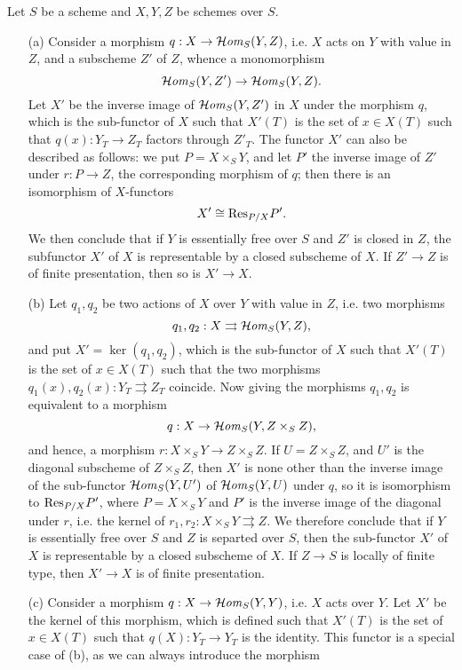 \begin{example}\label{scheme subfunctor Weil restriction example}
Let $S$ be a scheme and $X,Y,Z$ be schemes over $S$.
\begin{enumerate}
    \item[(a)] Consider a morphism $q:X\to\operatorname{\mathcal{H}\hspace*{-0.4pt}\textit{om}\hspace{0.5pt}}_S(Y,Z)$, i.e. $X$ acts on $Y$ with value in $Z$, and a subscheme $Z'$ of $Z$, whence a monomorphism
    \[\operatorname{\mathcal{H}\hspace*{-0.4pt}\textit{om}\hspace{0.5pt}}_S(Y,Z')\to\operatorname{\mathcal{H}\hspace*{-0.4pt}\textit{om}\hspace{0.5pt}}_S(Y,Z).\]
    Let $X'$ be the inverse image of $\operatorname{\mathcal{H}\hspace*{-0.4pt}\textit{om}\hspace{0.5pt}}_S(Y,Z')$ in $X$ under the morphism $q$, which is the sub-functor of $X$ such that $X'(T)$ is the set of $x\in X(T)$ such that $q(x):Y_T\to Z_T$ factors through $Z'_T$. The functor $X'$ can also be described as follows: we put $P=X\times_SY$, and let $P'$ the inverse image of $Z'$ under $r:P\to Z$, the corresponding morphism of $q$; then there is an isomorphism of $X$-functors
    \[X'\cong\mathrm{Res}_{P/X}P'.\]
    We then conclude that if $Y$ is essentially free over $S$ and $Z'$ is closed in $Z$, the subfunctor $X'$ of $X$ is representable by a closed subscheme of $X$. If $Z'\to Z$ is of finite presentation, then so is $X'\to X$.
    \item[(b)] Let $q_1,q_2$ be two actions of $X$ over $Y$ with value in $Z$, i.e. two morphisms
    \[q_1,q_2:X\rightrightarrows\operatorname{\mathcal{H}\hspace*{-0.4pt}\textit{om}\hspace{0.5pt}}_S(Y,Z),\]
    and put $X'=\ker(q_1,q_2)$, which is the sub-functor of $X$ such that $X'(T)$ is the set of $x\in X(T)$ such that the two morphisms $q_1(x),q_2(x):Y_T\rightrightarrows Z_T$ coincide. Now giving the morphisms $q_1,q_2$ is equivalent to a morphism
    \[q:X\to\operatorname{\mathcal{H}\hspace*{-0.4pt}\textit{om}\hspace{0.5pt}}_S(Y,Z\times_SZ),\]
    and hence, a morphism $r:X\times_SY\to Z\times_SZ$. If $U=Z\times_SZ$, and $U'$ is the diagonal subscheme of $Z\times_SZ$, then $X'$ is none other than the inverse image of the sub-functor $\operatorname{\mathcal{H}\hspace*{-0.4pt}\textit{om}\hspace{0.5pt}}_S(Y,U')$ of $\operatorname{\mathcal{H}\hspace*{-0.4pt}\textit{om}\hspace{0.5pt}}_S(Y,U)$ under $q$, so it is isomorphism to $\mathrm{Res}_{P/X}P'$, where $P=X\times_SY$ and $P'$ is the inverse image of the diagonal under $r$, i.e. the kernel of $r_1,r_2:X\times_SY\rightrightarrows Z$. We therefore conclude that if $Y$ is essentially free over $S$ and $Z$ is separted over $S$, then the sub-functor $X'$ of $X$ is representable by a closed subscheme of $X$. If $Z\to S$ is locally of finite type, then $X'\to X$ is of finite presentation.
    \item[(c)] Consider a morphism $q:X\to\operatorname{\mathcal{H}\hspace*{-0.4pt}\textit{om}\hspace{0.5pt}}_S(Y,Y)$, i.e. $X$ acts over $Y$. Let $X'$ be the kernel of this morphism, which is defined such that $X'(T)$ is the set of $x\in X(T)$ such that $q(X):Y_T\to Y_T$ is the identity. This functor is a special case of (b), as we can always introduce the morphism

\end{enumerate}
\end{example}
